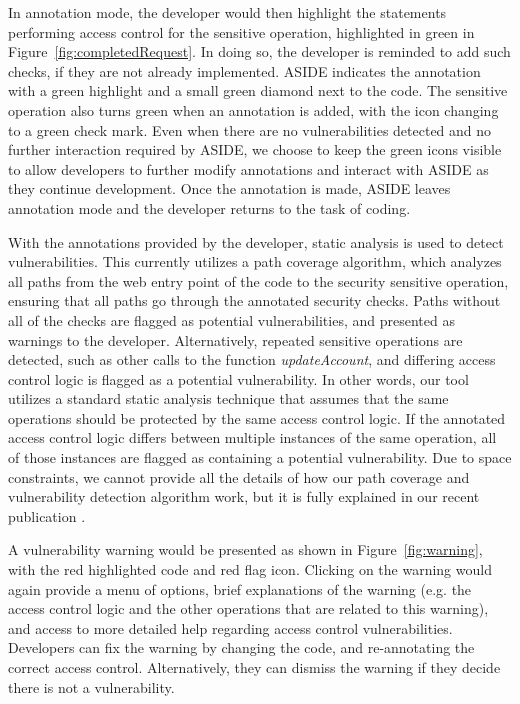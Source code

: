 \documentclass[twoside,letterpaper]{soups}
\begin{document}
In annotation mode, the developer would then highlight the statements performing access control for the sensitive operation, highlighted in green in Figure~\ref{fig:completedRequest}. In doing so, the developer is reminded to add such checks, if they are not already implemented. ASIDE indicates the annotation with a green highlight and a small green diamond next to the code. The sensitive operation also turns green when an annotation is added, with the icon changing to a green check mark. Even when there are no vulnerabilities detected and no further interaction required by ASIDE, we choose to keep the green icons visible to allow developers to further modify annotations and interact with ASIDE as they continue development. Once the annotation is made, ASIDE leaves annotation mode and the developer returns to the task of coding. 

With the annotations provided by the developer, static analysis is used to detect vulnerabilities. This currently utilizes a path coverage algorithm, which analyzes all paths from the web entry point of the code to the security sensitive operation, ensuring that all paths go through the annotated security checks. Paths without all of the checks are flagged as potential vulnerabilities, and presented as warnings to the developer.  Alternatively, repeated sensitive operations are detected, such as other calls to the function \textit{updateAccount}, and differing access control logic is flagged as a potential vulnerability. In other words, our tool utilizes a standard static analysis technique that assumes that the same operations should be protected by the same access control logic. If the annotated access control logic differs between multiple instances of the same operation, all of those instances are flagged as containing a potential vulnerability. Due to space constraints, we cannot provide all the details of how our path coverage and vulnerability detection algorithm work, but it is fully explained in our recent publication \cite{sacmat2015}.  

A vulnerability warning would be presented as shown in Figure~\ref{fig:warning}, with the red highlighted code and red flag icon. Clicking on the warning would again provide a menu of options, brief explanations of the warning (e.g. the access control logic and the other operations that are related to this warning), and access to more detailed help regarding access control vulnerabilities. Developers can fix the warning by changing the code, and re-annotating the correct access control. Alternatively, they can dismiss the warning if they decide there is not a vulnerability.
\end{document}
